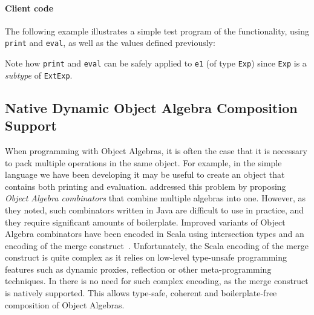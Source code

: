 \paragraph{Client code}
The following example illustrates a simple test program of the
functionality, using \lstinline{print} and \lstinline{eval}, as well
as the values defined previously:

\noindent Note how \lstinline{print} and \lstinline{eval} can be
safely applied to \lstinline{e1} (of type \lstinline{Exp}) since
\lstinline{Exp} is a \emph{subtype} of \lstinline{ExtExp}.

\subsection{Native Dynamic Object Algebra Composition Support}
\label{sec:dynamic}

When programming with Object Algebras, it is often the case that it is
necessary to pack multiple operations in the same object. For example, 
in the simple language we have been developing it may be useful to
create an object that contains both printing and evaluation.
\citet{oliveira2012extensibility} addressed this problem by proposing
\textit{Object Algebra combinators} that combine multiple algebras into one.
However, as they noted, such combinators written in Java are difficult to use in
practice, and they require significant amounts of boilerplate. Improved variants
of Object Algebra combinators have been encoded in Scala using intersection
types and an encoding of the merge construct~\cite{oliveira2013feature,
  rendel14attributes}. Unfortunately, the Scala encoding of the merge construct
is quite complex as it relies on low-level type-unsafe programming features such
as dynamic proxies, reflection or other meta-programming techniques. In \name
there is no need for such complex encoding, as the merge construct is natively
supported. This allows type-safe, coherent and boilerplate-free composition of
Object Algebras.


